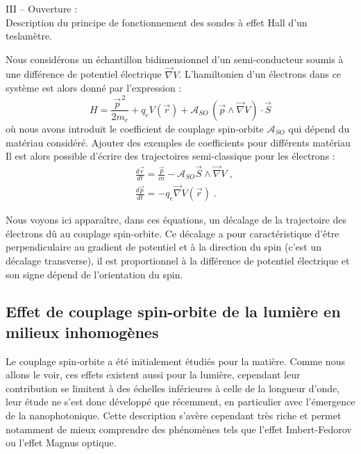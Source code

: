 \documentclass[a4paper,11pt]{article} %
\newenvironment{encart}[1]{%
	\begin{tcolorbox}
		[
		breakable, enhanced jigsaw, %
		arc = 1mm, %
		title = \textbf{#1}, %
		coltitle = white, %
		colbacktitle = blue, %
		colback = white, %
		colframe = blue %
		]
}{		
	\end{tcolorbox}
}
\begin{document}
\begin{encart}{Activité pédagogique 1 : étude de l'effet Hall classique}
		\vspace{0.5cm}
		III -- Ouverture :\\
		Description du principe de fonctionnement des sondes à effet Hall d'un teslamètre.
	\end{encart}
	
	
	
	Nous considérons un échantillon bidimensionnel d'un semi-conducteur soumis à une différence de potentiel électrique $\vec{\nabla} V$. L'hamiltonien d'un électrons dans ce système est alors donné par l'expression :
	\begin{equation*}
		\label{exp_hamiltonien_SHE}
		H = \frac{\vec{p}^{\, 2}}{2m_e} + q_e V(\vec{r}) + \mathcal{A}_{SO} \, (\vec{p} \wedge \! \vec{\nabla} V) \cdot \vec{S}
	\end{equation*}
	où nous avons introduit le coefficient de couplage spin-orbite $ \mathcal{A}_{SO} $ qui dépend du matériau considéré. {\color{gray} Ajouter des exemples de coefficients pour différents matériau}\\ %
	
	Il est alors possible d'écrire des trajectoires semi-classique pour les électrons :
	\begin{align}
		& \frac{d\vec{r}}{dt} = \frac{\vec{p}}{m} - \mathcal{A}_{SO} \vec{S} \wedge \vec{\nabla} V \; , \label{eq_mvt_SHE_r} \\
		& \frac{d \vec{p}}{dt} = - q_e \vec{\nabla} V(\vec{r}) \; . \label{eq_mvt_SHE_p}
	\end{align}

	Nous voyons ici apparaître, dans ces équations, un décalage de la trajectoire des électrons dû au couplage spin-orbite. Ce décalage a pour caractéristique d'être perpendiculaire au gradient de potentiel et à la direction du spin (c'est un décalage transverse), il est proportionnel à la différence de potentiel électrique et son signe dépend de l'orientation du spin.
	
	
	\subsection{Effet de couplage spin-orbite de la lumière en milieux inhomogènes}
	Le couplage spin-orbite a été initialement étudiés pour la matière. Comme nous allons le voir, ces effets existent aussi pour la lumière, cependant leur contribution se limitent à des échelles inférieures à celle de la longueur d'onde, leur étude ne s'est donc développé que récemment, en particulier avec l'émergence de la nanophotonique. Cette description s'avère cependant très riche et permet notamment de mieux comprendre des phénomènes tels que l'effet Imbert-Fedorov ou l'effet Magnus optique.\\
	
\end{document}
